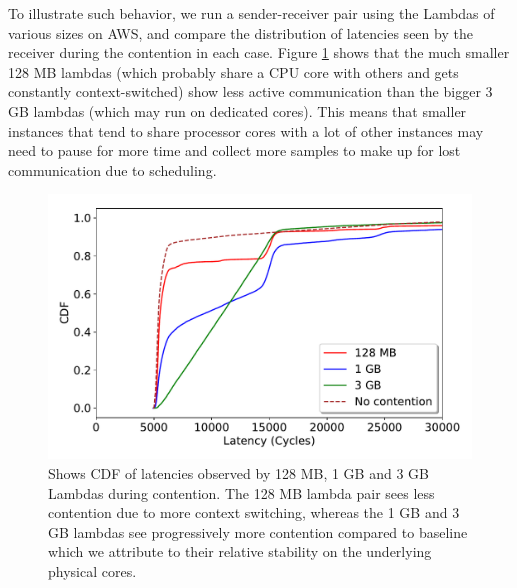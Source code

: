 To illustrate such behavior, we run a sender-receiver pair using the
Lambdas\cite{awslambda} of various sizes on AWS, and compare the distribution of
latencies seen by the receiver during the contention in each case. Figure
\ref{fig:context_switching} shows that the much smaller 128 MB lambdas (which
probably share a CPU core with others and gets constantly context-switched) show
less active communication than the bigger 3 GB lambdas (which may run on
dedicated cores).  This means that smaller instances that tend to share
processor cores with a lot of other instances may need to pause for more time
and collect more samples to make up for lost communication due to scheduling.


\begin{figure}[!t]
  \includegraphics[width=.99\linewidth]{fig/lambda_sched_effect.pdf}
  \caption{Shows CDF of latencies observed by 128 MB, 1 GB and 3 GB Lambdas during 
  contention. The 128 MB lambda pair sees less contention due to more context switching, 
  whereas the 1 GB and 3 GB lambdas see progressively more contention compared to baseline 
  which we attribute to their relative stability on the underlying physical cores. 
\label{fig:context_switching}}
\end{figure}

